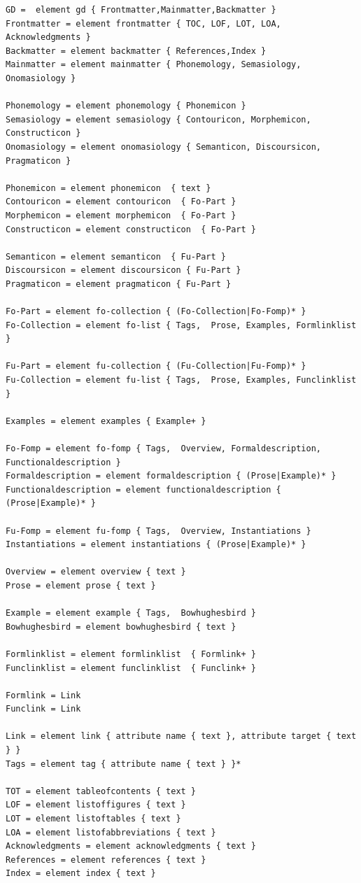 \documentclass[a4paper,12pt]{article}
\begin{document}
\begin{verbatim}
GD =  element gd { Frontmatter,Mainmatter,Backmatter }
Frontmatter = element frontmatter { TOC, LOF, LOT, LOA, Acknowledgments }
Backmatter = element backmatter { References,Index }
Mainmatter = element mainmatter { Phonemology, Semasiology, Onomasiology }

Phonemology = element phonemology { Phonemicon }
Semasiology = element semasiology { Contouricon, Morphemicon, Constructicon }
Onomasiology = element onomasiology { Semanticon, Discoursicon, Pragmaticon }   

Phonemicon = element phonemicon  { text }
Contouricon = element contouricon  { Fo-Part }
Morphemicon = element morphemicon  { Fo-Part }
Constructicon = element constructicon  { Fo-Part }        

Semanticon = element semanticon  { Fu-Part } 
Discoursicon = element discoursicon { Fu-Part } 
Pragmaticon = element pragmaticon { Fu-Part }

Fo-Part = element fo-collection { (Fo-Collection|Fo-Fomp)* }
Fo-Collection = element fo-list { Tags,  Prose, Examples, Formlinklist }

Fu-Part = element fu-collection { (Fu-Collection|Fu-Fomp)* }
Fu-Collection = element fu-list { Tags,  Prose, Examples, Funclinklist }

Examples = element examples { Example+ }
 
Fo-Fomp = element fo-fomp { Tags,  Overview, Formaldescription, Functionaldescription }
Formaldescription = element formaldescription { (Prose|Example)* }
Functionaldescription = element functionaldescription { (Prose|Example)* }

Fu-Fomp = element fu-fomp { Tags,  Overview, Instantiations }
Instantiations = element instantiations { (Prose|Example)* }

Overview = element overview { text }
Prose = element prose { text }

Example = element example { Tags,  Bowhughesbird }
Bowhughesbird = element bowhughesbird { text }

Formlinklist = element formlinklist  { Formlink+ }
Funclinklist = element funclinklist  { Funclink+ }

Formlink = Link
Funclink = Link

Link = element link { attribute name { text }, attribute target { text } }
Tags = element tag { attribute name { text } }*

TOT = element tableofcontents { text }
LOF = element listoffigures { text }
LOT = element listoftables { text }
LOA = element listofabbreviations { text }
Acknowledgments = element acknowledgments { text }
References = element references { text }
Index = element index { text }

\end{verbatim}
\z
\normalsize
\end{document}
